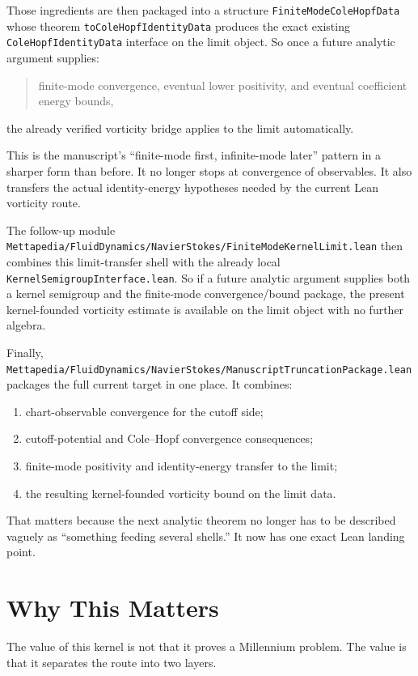 \documentclass[11pt]{article}
\theoremstyle{remark}
\begin{document}
Those ingredients are then packaged into a structure
\texttt{FiniteModeColeHopfData} whose theorem
\texttt{toColeHopfIdentityData} produces the exact existing
\texttt{ColeHopfIdentityData} interface on the limit object.  So once a future
analytic argument supplies:
\begin{quote}
finite-mode convergence, eventual lower positivity, and eventual coefficient
energy bounds,
\end{quote}
the already verified vorticity bridge applies to the limit automatically.

This is the manuscript's ``finite-mode first, infinite-mode later'' pattern in
a sharper form than before.  It no longer stops at convergence of observables.
It also transfers the actual identity-energy hypotheses needed by the current
Lean vorticity route.

The follow-up module
\texttt{Mettapedia/FluidDynamics/NavierStokes/FiniteModeKernelLimit.lean}
then combines this limit-transfer shell with the already local
\texttt{KernelSemigroupInterface.lean}.  So if a future analytic argument
supplies both a kernel semigroup and the finite-mode convergence/bound package,
the present kernel-founded vorticity estimate is available on the limit object
with no further algebra.

Finally,
\texttt{Mettapedia/FluidDynamics/NavierStokes/ManuscriptTruncationPackage.lean}
packages the full current target in one place.  It combines:
\begin{enumerate}[leftmargin=1.5em]
  \item chart-observable convergence for the cutoff side;
  \item cutoff-potential and Cole--Hopf convergence consequences;
  \item finite-mode positivity and identity-energy transfer to the limit;
  \item the resulting kernel-founded vorticity bound on the limit data.
\end{enumerate}

That matters because the next analytic theorem no longer has to be described
vaguely as ``something feeding several shells.''  It now has one exact Lean
landing point.

\section{Why This Matters}

The value of this kernel is not that it proves a Millennium problem.  The value
is that it separates the route into two layers.
\end{document}
